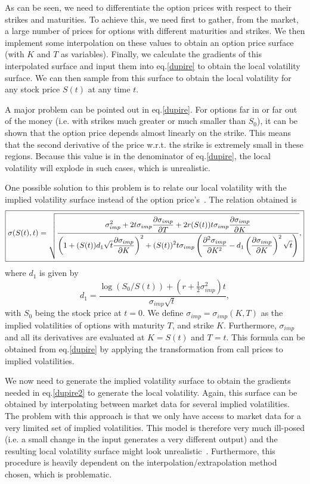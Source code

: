 As can be seen, we need to differentiate the option prices with respect to their strikes and maturities. To achieve this, we need first to gather, from the market, a large number of prices for options with different maturities and strikes. We then implement some interpolation on these values to obtain an option price surface (with $K$ and $T$ as variables). Finally, we calculate the gradients of this interpolated surface and input them into eq.\eqref{dupire} to obtain the local volatility surface.
We can then sample from this surface to obtain the local volatility for any stock price $S(t)$ at any time $t$.


A major problem can be pointed out in eq.\eqref{dupire}. For options far in or far out of the money (i.e. with strikes much greater or much smaller than $S_0$), it can be shown that the option price depends almost linearly on the strike. This means that the second derivative of the price w.r.t. the strike is extremely small in these regions. Because this value is in the denominator of eq.\eqref{dupire}, the local volatility will explode in such cases, which is unrealistic.


One possible solution to this problem is to relate our local volatility with the implied volatility surface instead of the option price's~\citep{Wilmott}.
The relation obtained is
\begin{equation}\label{dupire2}
\boxed{\sigma(S(t),t)=\sqrt{\frac{\displaystyle\sigma_{imp}^2+2t\sigma_{imp}\pdv{\sigma_{imp}}{T}+2r(S(t))t\sigma_{imp}\pdv{\sigma_{imp}}{K}}{\displaystyle\left(1+(S(t))d_1\sqrt{t}\pdv{\sigma_{imp}}{K}\right)^2+(S(t))^2t\sigma_{imp}\left(\pdv{^2\sigma_{imp}}{K^2}-d_1\left(\pdv{\sigma_{imp}}{K}\right)^2\sqrt{t}\right)}},}
\end{equation}
\noindent where $d_1$ is given by
\begin{equation}
d_1=\frac{\log(S_0/S(t))+\left(r+\frac{1}{2}\sigma_{imp}^2\right)t}{\sigma_{imp}\sqrt{t}},
\end{equation}
\noindent with $S_0$ being the stock price at $t=0$. We define $\sigma_{imp}=\sigma_{imp}(K,T)$ as the implied volatilities of options with maturity $T$, and strike $K$. Furthermore, $\sigma_{imp}$ and all its derivatives are evaluated at $K=S(t)$ and $T=t$. This formula can be obtained from eq.\eqref{dupire} by applying the transformation from call prices to implied volatilities.


We now need to generate the implied volatility surface to obtain the gradients needed in eq.\eqref{dupire2} to generate the local volatility. Again, this surface can be obtained by interpolating between market data for several implied volatilities. The problem with this approach is that we only have access to market data for a very limited set of implied volatilities. This model is therefore very much ill-posed (i.e. a small change in the input generates a very different output) and the resulting local volatility surface might look unrealistic~\citep{Wilmott}. Furthermore, this procedure is heavily dependent on the interpolation/extrapolation method chosen, which is problematic.

